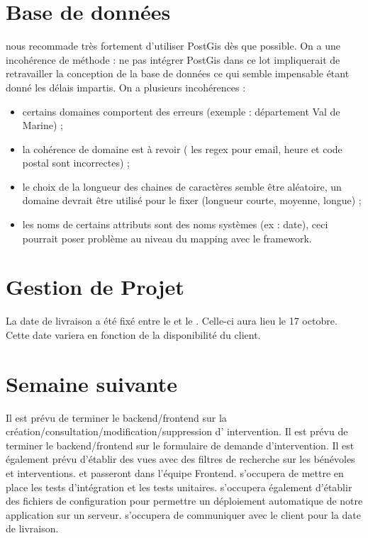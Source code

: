 \documentclass [a4paper] {article}
\begin{document}
\section{Base de données}
\nomTuteurPedago{} nous recommade très fortement d'utiliser PostGis dès que possible. On a une incohérence de méthode : ne pas intégrer PostGis dans ce lot impliquerait de retravailler la conception de la base de données ce qui semble impensable étant donné les délais impartis. 
On a plusieurs incohérences : 
\begin{itemize}
\item certains domaines comportent des erreurs (exemple : département Val de Marine) ;
\item la cohérence de domaine est à revoir ( les regex pour email, heure et code postal sont incorrectes) ;
\item le choix de la longueur des chaines de caractères semble être aléatoire, un domaine devrait être utilisé pour le fixer (longueur courte, moyenne, longue) ;
\item les noms de certains attributs sont des noms systèmes (ex : date), ceci pourrait poser problème au niveau du mapping avec le framework.
\end{itemize}

\section{Gestion de Projet}
La date de livraison a été fixé entre le \RD{} et le \CP{}. Celle-ci aura lieu le 17 octobre. Cette date variera en fonction de la disponibilité du client.

\section{Semaine suivante}
Il est prévu de terminer le backend/frontend sur la création/consultation/modification/suppression d' intervention.
Il est prévu de terminer le backend/frontend sur le formulaire de demande d'intervention.
Il est également prévu d'établir des vues avec des filtres de recherche sur les bénévoles et interventions. 
\Francois{} et \Juliana{} passeront dans l'équipe Frontend. 
\Matthieu{} s'occupera de mettre en place les tests d'intégration et les tests unitaires. 
\Matthieu{} s'occupera également d'établir des fichiers de configuration pour permettre un déploiement automatique de notre application sur un serveur.
\Pierre{} s'occupera de communiquer avec le client pour la date de livraison.


\newpage
\end{document}
